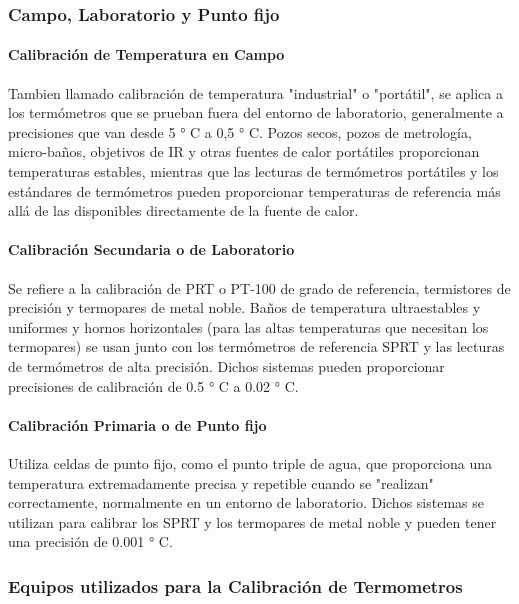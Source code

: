 	\subsubsection{Campo, Laboratorio y Punto fijo}
		\paragraph{Calibración de Temperatura en Campo}
			\par 
				Tambien llamado calibración de temperatura "industrial" o "portátil", se aplica a los termómetros que se prueban fuera del entorno de laboratorio, generalmente a precisiones que van desde 5 ° C a 0,5 ° C. Pozos secos, pozos de metrología, micro-baños, objetivos de IR y otras fuentes de calor portátiles proporcionan temperaturas estables, mientras que las lecturas de termómetros portátiles y los estándares de termómetros pueden proporcionar temperaturas de referencia más allá de las disponibles directamente de la fuente de calor.
				
\clearpage
\thispagestyle{plain}

		\paragraph{Calibración Secundaria o de Laboratorio}
			\par 
				Se refiere a la calibración de PRT o PT-100 de grado de referencia, termistores de precisión y termopares de metal noble. Baños de temperatura ultraestables y uniformes y hornos horizontales (para las altas temperaturas que necesitan los termopares) se usan junto con los termómetros de referencia SPRT y las lecturas de termómetros de alta precisión. Dichos sistemas pueden proporcionar precisiones de calibración de 0.5 ° C a 0.02 ° C.
				
		\paragraph{Calibración Primaria o de Punto fijo}
			\par 
				Utiliza celdas de punto fijo, como el punto triple de agua, que proporciona una temperatura extremadamente precisa y repetible cuando se "realizan" correctamente, normalmente en un entorno de laboratorio. Dichos sistemas se utilizan para calibrar los SPRT y los termopares de metal noble y pueden tener una precisión de 0.001 ° C.
				
	\subsubsection{Equipos utilizados para la Calibración de Termometros}
		
			
			
			
		
		
